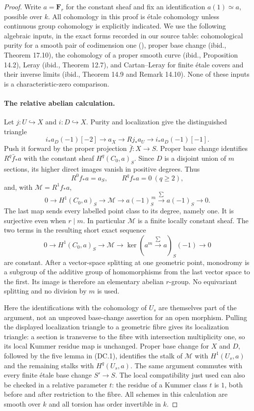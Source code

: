 \begin{proof}
Write $a=\mathbf F_r$ for the constant sheaf and fix an identification
$a(1)\simeq a$, possible over $k$. All cohomology in this proof is
\'etale cohomology unless continuous group cohomology is explicitly
indicated. We use the following algebraic inputs, in the exact forms
recorded in our source table: cohomological purity for a smooth pair of
codimension one (\citealp[Theorem 16.7]{CF_Milne2013}), proper base change
(ibid., Theorem 17.10), the cohomology of a proper smooth curve (ibid.,
Proposition 14.2), Leray (ibid., Theorem 12.7), and Cartan--Leray for
finite \'etale covers and their inverse limits (ibid., Theorem 14.9 and
Remark 14.10). None of these inputs is a characteristic-zero comparison.

\paragraph{The relative abelian calculation.}
Let $j:U\hookrightarrow X$ and $i:D\hookrightarrow X$.
Purity and localization give the distinguished triangle
\[
 i_*a_D(-1)[-2]\longrightarrow a_X\longrightarrow Rj_*a_U
 \longrightarrow i_*a_D(-1)[-1].
\]
Push it forward by the proper projection $\bar f:X\to S$.
Proper base change identifies $R^q\bar f_*a$ with the constant sheaf
$H^q(C_0,a)_S$. Since $D$ is a disjoint union of $m$ sections,
its higher direct images vanish in positive degrees. Thus
\[
 R^0f_*a=a_S,\qquad R^qf_*a=0\ (q\geq2),
\]
and, with $\mathcal M=R^1f_*a$,
\[
 0\to H^1(C_0,a)_S\to\mathcal M
 \to a(-1)_S^{\,m}\overset{\sum}{\longrightarrow}a(-1)_S\to0.       \tag{DC.1}
\]
The last map sends every labelled point class to its degree, namely one.
It is surjective even when $r\mid m$. In particular $\mathcal M$ is
a finite locally constant sheaf. The two terms in the resulting short
exact sequence
\[
 0\to H^1(C_0,a)_S\to\mathcal M
 \to\ker(a^m\overset{\sum}{\longrightarrow}a)_S(-1)\to0
\]
are constant. After a vector-space splitting at one geometric point,
monodromy is a subgroup of the additive group of homomorphisms from the
last vector space to the first. Its image is therefore an elementary
abelian $r$-group. No equivariant splitting and no division by $m$ is
used.

Here the identifications with the cohomology of $U_s$ are themselves
part of the argument, not an unproved base-change assertion for an open
morphism. Pulling the displayed localization triangle to a geometric
fibre gives its localization triangle: a section is transverse to the
fibre with intersection multiplicity one, so its local Kummer residue
map is unchanged. Proper base change for $X$ and $D$, followed by the
five lemma in (DC.1), identifies the stalk of $\mathcal M$ with
$H^1(U_s,a)$ and the remaining stalks with $H^q(U_s,a)$. The same
argument commutes with every finite \'etale base change $S'\to S$.
The local compatibility just used can also be checked in a relative
parameter $t$: the residue of a Kummer class $t$ is $1$, both before
and after restriction to the fibre. All schemes in this calculation
are smooth over $k$ and all torsion has order invertible in $k$.


\end{proof}
